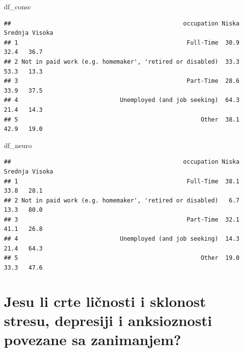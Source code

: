 \documentclass[
]{article}
\newenvironment{Shaded}{\begin{snugshade}}{\end{snugshade}}
\newcommand{\NormalTok}[1]{#1}
\begin{document}
\begin{Shaded}
\begin{Highlighting}[]
\NormalTok{df\_consc}
\end{Highlighting}
\end{Shaded}

\begin{verbatim}
##                                                 occupation Niska Srednja Visoka
## 1                                                Full-Time  30.9    32.4   36.7
## 2 Not in paid work (e.g. homemaker', 'retired or disabled)  33.3    53.3   13.3
## 3                                                Part-Time  28.6    33.9   37.5
## 4                             Unemployed (and job seeking)  64.3    21.4   14.3
## 5                                                    Other  38.1    42.9   19.0
\end{verbatim}

\begin{Shaded}
\begin{Highlighting}[]
\NormalTok{df\_neuro}
\end{Highlighting}
\end{Shaded}

\begin{verbatim}
##                                                 occupation Niska Srednja Visoka
## 1                                                Full-Time  38.1    33.8   28.1
## 2 Not in paid work (e.g. homemaker', 'retired or disabled)   6.7    13.3   80.0
## 3                                                Part-Time  32.1    41.1   26.8
## 4                             Unemployed (and job seeking)  14.3    21.4   64.3
## 5                                                    Other  19.0    33.3   47.6
\end{verbatim}

\section{Jesu li crte ličnosti i sklonost stresu, depresiji i
anksioznosti povezane sa
zanimanjem?}\label{jesu-li-crte-liux10dnosti-i-sklonost-stresu-depresiji-i-anksioznosti-povezane-sa-zanimanjem}
\end{document}
